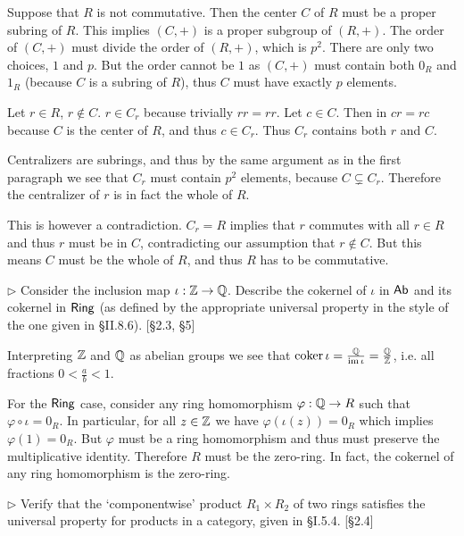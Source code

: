 \begin{solution}
	Suppose that $R$ is not commutative. Then the center $C$ of $R$ must be a proper subring of $R$. This implies $(C, +)$ is a proper subgroup of $(R, +)$. The order of $(C, +)$ must divide the order of $(R, +)$, which is $p^2$. There are only two choices, $1$ and $p$. But the order cannot be $1$ as $(C, +)$ must contain both $0_R$ and $1_R$ (because $C$ is a subring of $R$), thus $C$ must have exactly $p$ elements.
	
	Let $r \in R$, $r \not \in C$. $r \in C_r$ because trivially $rr = rr$. Let $c \in C$. Then in $cr = rc$ because $C$ is the center of $R$, and thus $c \in C_r$. Thus $C_r$ contains both $r$ and $C$.
	
	Centralizers are subrings, and thus by the same argument as in the first paragraph we see that $C_r$ must contain $p^2$ elements, because $C \subsetneq C_r$. Therefore the centralizer of $r$ is in fact the whole of $R$.
	
	This is however a contradiction. $C_r = R$ implies that $r$ commutes with all $r \in R$ and thus $r$ must be in $C$, contradicting our assumption that $r \not \in C$. But this means $C$ must be the whole of $R$, and thus $R$ has to be commutative.
\end{solution}

\begin{problem}
	$\triangleright$ Consider the inclusion map $\iota: \mathbb{Z} \to \mathbb{Q}$. Describe the cokernel of $\iota$ in $\mathsf{Ab}$ and its cokernel in $\mathsf{Ring}$ (as defined by the appropriate universal property in the style of the one given in \S II.8.6). [\S 2.3, \S 5]
\end{problem}

\begin{solution}
	Interpreting $\mathbb{Z}$ and $\mathbb{Q}$ as abelian groups we see that $\operatorname{coker} \iota = \frac{\mathbb{Q}}{\operatorname{im} \iota} = \frac{\mathbb{Q}}{\mathbb{Z}}$, i.e. all fractions $0 < \frac{a}{b} < 1$.
	
	For the $\mathsf{Ring}$ case, consider any ring homomorphism $\varphi: \mathbb{Q} \to R$ such that $\varphi \circ \iota = 0_R$. In particular, for all $z \in \mathbb{Z}$ we have $\varphi(\iota(z)) = 0_R$ which implies $\varphi(1) = 0_R$. But $\varphi$ must be a ring homomorphism and thus must preserve the multiplicative identity. Therefore $R$ must be the zero-ring. In fact, the cokernel of any ring homomorphism is the zero-ring.
\end{solution}

\begin{problem}
	$\triangleright$ Verify that the `componentwise' product $R_1 \times R_2$ of two rings satisfies the universal property for products in a category, given in \S I.5.4. [\S 2.4]
\end{problem}

